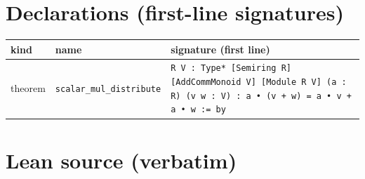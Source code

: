 \documentclass[12pt]{article}
\begin{document}
\section*{Declarations (first-line signatures)} 
\begin{center}
\begin{tabular}{lll}
\textbf{kind} & \textbf{name} & \textbf{signature (first line)} \\ \hline
theorem & \texttt{scalar\_mul\_distribute} & \texttt{{R V : Type*} [Semiring R] [AddCommMonoid V] [Module R V] (a : R) (v w : V) : a • (v + w) = a • v + a • w := by} \\
\end{tabular}
\end{center}

\section*{Lean source (verbatim)}
\end{document}
